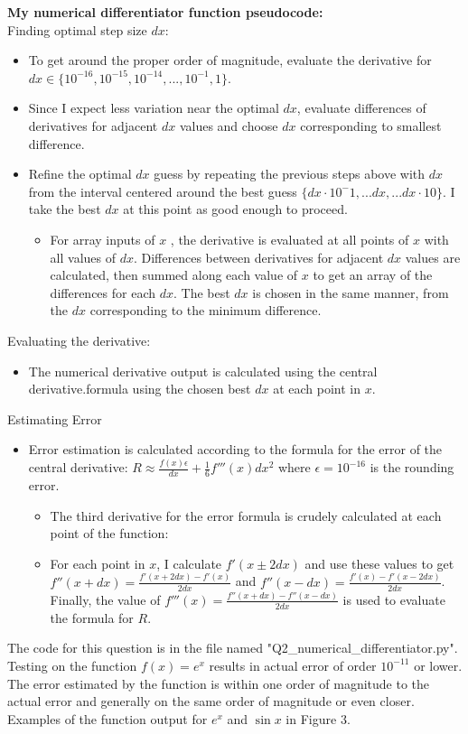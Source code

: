 \documentclass{article}
\newcommand{\<}[1]{\left\langle #1 \right\rangle }
\begin{document}
\textbf{My numerical differentiator function pseudocode:}\\
Finding optimal step size $dx$:
\begin{itemize}
	\item To get around the proper order of magnitude, evaluate the derivative for $dx \in \{10^{-16}, 10^{-15}, 10^{-14}, ..., 10^{-1}, 1 \}$.
	\item Since I expect less variation near the optimal $dx$, evaluate differences of derivatives for adjacent $dx$ values and choose $dx$ corresponding to smallest difference.
	\item Refine the optimal $dx$ guess by repeating the previous steps above with $dx$ from the interval centered around the best guess $\{dx\cdot10^-1, ... dx, ... dx\cdot10\}$. I take the best $dx$ at this point as good enough to proceed.
	\begin{itemize}
		\item For array inputs of $x$ , the derivative is evaluated at all points of $x$ with all values of $dx$. Differences between derivatives for adjacent $dx$ values are calculated, then summed along each value of $x$ to get an array of the differences for each $dx$. The best $dx$ is chosen in the same manner, from the  $dx$ corresponding to the minimum difference.
	\end{itemize}
\end{itemize}
Evaluating the derivative:
\begin{itemize}
	\item The numerical derivative output is calculated using the central derivative.formula using the chosen best $dx$ at each point in $x$.
\end{itemize}
Estimating Error
\begin{itemize}
	\item Error estimation is calculated according to the formula for the error of the central derivative: $R \approx \frac{f(x)\epsilon}{dx} + \frac{1}{6}f'''(x)dx^2$ where $\epsilon = 10^{-16}$ is the rounding error.
	\begin{itemize}
		\item The third derivative for the error formula is crudely calculated at each point of the function:
		\item For each point in $x$, I calculate $f'(x\pm2dx)$ and use these values to get $f''(x+dx) = \frac{f'(x+2dx) - f'(x)}{2dx}$ and $f''(x-dx) = \frac{f'(x) - f'(x-2dx)}{2dx}$. Finally, the value of $f'''(x) = \frac{f''(x+dx) - f''(x-dx)}{2dx}$ is used to evaluate the formula for $R$.
	\end{itemize}
\end{itemize}
The code for this question is in the file named "Q2\_numerical\_differentiator.py". Testing on the function $f(x) = e^x$ results in actual error of order $10^{-11}$ or lower. The error estimated by the function is within one order of magnitude to the actual error and generally on the same order of magnitude or even closer. Examples of the function output for $e^x$ and $\sin{x}$ in Figure 3.
\end{document}
